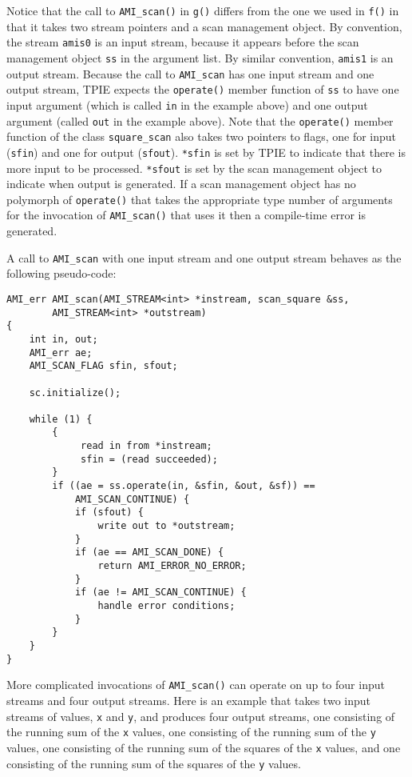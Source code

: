 Notice that the call to \verb|AMI_scan()| in \verb|g()| differs from
the one we used in \verb|f()| in that it takes two stream pointers and
a scan management object.  By convention, the stream \verb|amis0| is
an input stream, because it appears before the scan management object
\verb|ss| in the argument list.  By similar convention, \verb|amis1|
is an output stream.  Because the call to \verb|AMI_scan| has one
input stream and one output stream, TPIE expects the \verb|operate()|
member function of \verb|ss| to have one input argument (which is
called \verb|in| in the example above) and one output argument (called
\verb|out| in the example above).  Note that the \verb|operate()|
member function of the class \verb|square_scan| also takes two
pointers to flags, one for input (\verb|sfin|) and one for output
(\verb|sfout|).  \verb|*sfin| is set by TPIE to indicate that there is
more input to be processed.  \verb|*sfout| is set by the scan
management object to indicate when output is generated.
If a scan management object has no polymorph of \verb|operate()| that
takes the appropriate type number of arguments for the invocation of
\verb|AMI_scan()| that uses it then a compile-time error is generated.

A call to \verb|AMI_scan| with one input stream and one output stream
behaves as the following pseudo-code:

\begin{verbatim} 
AMI_err AMI_scan(AMI_STREAM<int> *instream, scan_square &ss, 
        AMI_STREAM<int> *outstream)
{
    int in, out;
    AMI_err ae;    
    AMI_SCAN_FLAG sfin, sfout;

    sc.initialize();

    while (1) {
        {
             read in from *instream;
             sfin = (read succeeded);
        }
        if ((ae = ss.operate(in, &sfin, &out, &sf)) == 
            AMI_SCAN_CONTINUE) {
            if (sfout) {
                write out to *outstream;
            }
            if (ae == AMI_SCAN_DONE) {
                return AMI_ERROR_NO_ERROR;
            }
            if (ae != AMI_SCAN_CONTINUE) {
                handle error conditions;
            }
        }
    }
}
\end{verbatim}

More complicated invocations of \verb|AMI_scan()| can operate on up
to four input streams and four output streams.  Here is an example
that takes two input streams of values, \verb|x| and \verb|y|, and
produces four output streams, 
one consisting of the running sum of the
\verb|x| values,
one consisting of the running sum of the
\verb|y| values,
one consisting of the running sum of the
squares of the \verb|x| values,
and
one consisting of the running sum of the
squares of the \verb|y| values.

